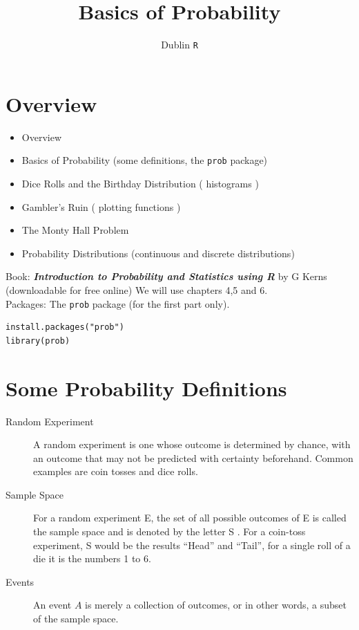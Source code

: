 \documentclass[11pt]{article} %
\title{Basics of Probability}
\author{Dublin \texttt{R}}
\begin{document}
\maketitle
\tableofcontents
\section{Overview}

\begin{itemize}
\item Overview
\item Basics of Probability (some definitions, the \texttt{prob} package) 
\item Dice Rolls and the Birthday Distribution ( histograms )
\item Gambler's Ruin ( plotting functions )
\item The Monty Hall Problem 
 
\item Probability Distributions (continuous and discrete distributions)
\end{itemize}
Book: \textbf{\textit{Introduction to Probability and Statistics using R}} by G Kerns \\ (downloadable for free online) We will use chapters 4,5 and 6. \\ \bigskip
Packages: The \texttt{prob} package (for the first part only).

\begin{framed}
\begin{verbatim}
install.packages("prob")
library(prob)
\end{verbatim}
\end{framed}
\newpage
\section{Some Probability Definitions}

\begin{description}
\item[Random Experiment] A random experiment is one whose outcome is determined by chance, with an outcome that may not be predicted with certainty beforehand. Common examples are coin tosses and dice rolls.
\item[Sample Space] For a random experiment E, the set of all possible outcomes of E is called the sample space and
is denoted by the letter S . For a coin-toss experiment, S would be the results ``Head” and ``Tail”, for a  single roll of a die it is the numbers 1 to 6.
\item[Events] An event $A$
 is merely a collection of outcomes, or in other words, a subset of the sample space.
\end{description}
\end{document}
